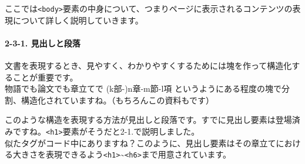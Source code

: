 \begin{Shaded}
\begin{Highlighting}[]
      \DataTypeTok{\textless{}}\DataTypeTok{\textgreater{}}\DataTypeTok{\textless{}/}\DataTypeTok{\textgreater{}}
      \DataTypeTok{\textless{}}\DataTypeTok{\textgreater{}}
        \DataTypeTok{\textless{}}\DataTypeTok{\textgreater{}}
          \DataTypeTok{\textless{}}\DataTypeTok{\textgreater{}}\DataTypeTok{\textless{}/}\DataTypeTok{\textgreater{}}
          \DataTypeTok{\textless{}}\DataTypeTok{\textgreater{}}\DataTypeTok{\textless{}/}\DataTypeTok{\textgreater{}}
          \DataTypeTok{\textless{}}\DataTypeTok{\textgreater{}}\DataTypeTok{\textless{}/}\DataTypeTok{\textgreater{}}
        \DataTypeTok{\textless{}/}\DataTypeTok{\textgreater{}}
      \DataTypeTok{\textless{}/}\DataTypeTok{\textgreater{}}
    \DataTypeTok{\textless{}/}\DataTypeTok{\textgreater{}}
  \DataTypeTok{\textless{}/}\DataTypeTok{\textgreater{}}
\DataTypeTok{\textless{}/}\DataTypeTok{\textgreater{}}
\end{Highlighting}
\end{Shaded}

ここでは\texttt{\textless{}body\textgreater{}}要素の中身について、つまりページに表示されるコンテンツの表現について詳しく説明していきます。

\paragraph{2-3-1.
見出しと段落}\label{ux898bux51faux3057ux3068ux6bb5ux843d}

文書を表現するとき、見やすく、わかりやすくするためには塊を作って構造化することが重要です。\\
物語でも論文でも章立てで (k部-)n章-m節-l項
というようにある程度の塊で分割、構造化されていますね。（もちろんこの資料もです）

このような構造を表現する方法が見出しと段落です。すでに見出し要素は登場済みですね。\texttt{\textless{}h1\textgreater{}}要素がそうだと2-1.で説明しました。\\
似たタグがコード中にありますね？このように、見出し要素はその章立てにおける大きさを表現できるよう\texttt{\textless{}h1\textgreater{}}\textasciitilde{}\texttt{\textless{}h6\textgreater{}}まで用意されています。

